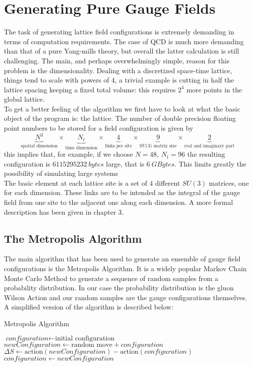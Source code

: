 \section{Generating Pure Gauge Fields}
The task of generating lattice field configurations is extremely demanding in terms of computation requirements. The case of QCD is much more demanding than that of a pure Yang-mills theory, but overall the latter calculation is still challenging. The main, and perhaps overwhelmingly simple, reason for this problem is the dimensionality. Dealing with a discretized space-time lattice, things tend to scale with powers of $4$, a trivial example is cutting in half the lattice spacing keeping a fixed total volume: this requires $2^4$ more points in the global lattice. \\
To get a better feeling of the algorithm we first have to look at what the basic object of the program is: the lattice. The number of double precision floating point numbers to be stored for a field configuration is given by
\begin{equation}
    \underbrace{N^3}_\text{spatial dimension} \times
    \underbrace{N_t}_\text{time dimension} \times
    \underbrace{4}_\text{links per site} \times 
    \underbrace{9}_\text{SU(3) matrix size} \times
    \underbrace{2}_\text{real and imaginary part}
\end{equation}
this implies that, for example, if we choose $N=48,~N_t=96$ the resulting configuration is $6115295232~bytes$ large, that is $6~GBytes$.  This limits greatly the possibility of simulating large systems \\
The basic element at each lattice site is a set of $4$ different $SU(3)$ matrices, one for each dimension. These links are to be intended as the integral of the gauge field from one site to the adjacent one along each dimension. A more formal description has been given in chapter 3.\\
\subsection{The Metropolis Algorithm}
The main algorithm that has been used to generate an ensemble of gauge field configurations is the Metropolis Algorithm. It is a widely popular Markov Chain Monte Carlo Method to generate a sequence of random samples from a probability distribution. In our case the probability distribution is the gluon Wilson Action and our random samples are the gauge configurations themselves. A simplified version of the algorithm is described below:
\begin{algorithm}
    \caption{Metropolis Algorithm}\label{metropolis:algo}
    \begin{algorithmic}[1]
    \State $\textit{configuration} \gets \text{initial configuration}$
        \State $newConfiguration  \gets \text{random move} + configuration$  
        \State $\Delta S \gets \text{action} (newConfiguration) - \text{action} (configuration)$
            \State $configuration \gets newConfiguration$
        \EndIf
    \EndFor
    \end{algorithmic}
\end{algorithm}

